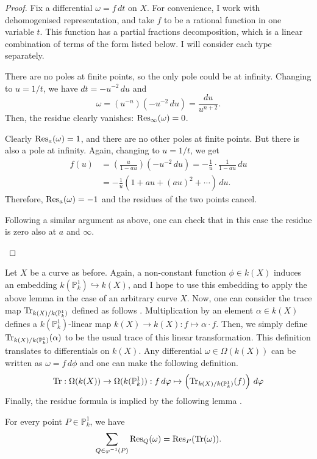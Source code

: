 \begin{proof}
  Fix a differential $\omega=f\,dt$ on $X$. For convenience, I work with
  dehomogenised representation, and take $f$ to be a rational function
  in one variable $t$. This function has a partial fractions decomposition,
  which is a linear combination of terms of the form listed below. I will
  consider each type separately.
  \begin{description}[style=nextline]
    \item[Term of type $\omega=t^{n}\,dt$:] There are no poles at finite
          points, so the only pole could be at infinity. Changing to
          $u=1/t$, we have $dt=-u^{-2}\,du$ and
          \[\omega=(u^{-n})(-u^{-2}\,du)=\frac{du}{u^{n+2}}.\]
          Then, the residue clearly vanishes: $\operatorname{Res}_{\infty}(\omega)=0$.
    \item[Term of type $\omega=\frac{dt}{t-a}$:] Clearly $\operatorname{Res}_{a}(\omega)=1$,
          and there are no other poles at finite points. But there is also a
          pole at infinity. Again, changing to $u=1/t$, we get
          \begin{align*}
            f(u)&=\left(\frac{u}{1-au}\right)(-u^{-2}\,du)
            =-\frac1{u}\cdot\frac1{1-au}\,du \\
            &=-\frac1{u}\left(1+au+(au)^{2}+\cdots\right)\,du.
          \end{align*}
          Therefore, $\operatorname{Res}_{a}(\omega)=-1$ and the residues of the two points
          cancel.
    \item[Term of type $\omega=\frac{dt}{(t-a)^{n}}$ for $n>1$:] Following
          a similar argument as above, one can check that in this case
          the residue is zero also at $a$ and $\infty$.
  \end{description}
\end{proof}
Let $X$ be a curve as before. Again, a non-constant function $\phi\in k(X)$
induces an embedding $k(\mathbb{P}^{1}_{k})\hookrightarrow k(X)$, and I hope
to use this embedding to apply the above lemma in the case of an arbitrary
curve $X$. Now, one can consider the trace map $\operatorname{Tr}_{k(X)/k(\mathbb{P}^{1}_{k})}$
defined as follows \cite{milne}. Multiplication by an element
$\alpha\in k(X)$ defines a $k(\mathbb{P}^{1}_{k})$-linear map
$k(X)\to k(X): f\mapsto \alpha\cdot f$. Then, we simply define
$\operatorname{Tr}_{k(X)/k(\mathbb{P}^{1}_{k})}(\alpha)$ to be the usual trace of this linear
transformation. This definition translates to differentials on $k(X)$.
Any differential $\omega\in\Omega(k(X))$ can be written as $\omega=f\,d\phi$
and one can make the following definition.
\[
  \operatorname{Tr}:\Omega(k(X))\to \Omega(k(\mathbb{P}^{1}_{k}))
  :f\,d\varphi\mapsto \left(\operatorname{Tr}_{k(X)/k(\mathbb{P}^{1}_{k})}(f)\right)\,d\varphi
\]
Finally, the residue formula is implied by the following lemma
\cite{serre}.
\begin{lemm}
  For every point $P\in\mathbb{P}^{1}_{k}$, we have
  \[
    \sum_{Q\in\varphi^{-1}(P)}\operatorname{Res}_{Q}(\omega)=\operatorname{Res}_{P}(\operatorname{Tr}(\omega)).
  \]
\end{lemm}

